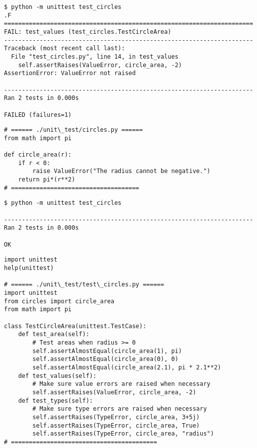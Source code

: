 \documentclass{beamer}
\begin{document}
\begin{frame}[fragile]{}
\begin{verbatim}
$ python -m unittest test_circles   
.F
======================================================================
FAIL: test_values (test_circles.TestCircleArea)
----------------------------------------------------------------------
Traceback (most recent call last):
  File "test_circles.py", line 14, in test_values
    self.assertRaises(ValueError, circle_area, -2)
AssertionError: ValueError not raised

----------------------------------------------------------------------
Ran 2 tests in 0.000s

FAILED (failures=1)
\end{verbatim}
\end{frame}

\begin{frame}[fragile]{}
\begin{verbatim}
# ====== ./unit\_test/circles.py ======
from math import pi

def circle_area(r):
    if r < 0:
        raise ValueError("The radius cannot be negative.")
    return pi*(r**2)
# ====================================
\end{verbatim}
\begin{verbatim}
$ python -m unittest test_circles

----------------------------------------------------------------------
Ran 2 tests in 0.000s

OK
\end{verbatim}
\end{frame}

\begin{frame}[fragile]{}
\begin{verbatim}
import unittest
help(unittest)

# ====== ./unit\_test/test\_circles.py ======
import unittest
from circles import circle_area
from math import pi

class TestCircleArea(unittest.TestCase):
    def test_area(self):
        # Test areas when radius >= 0
        self.assertAlmostEqual(circle_area(1), pi)
        self.assertAlmostEqual(circle_area(0), 0)
        self.assertAlmostEqual(circle_area(2.1), pi * 2.1**2)
    def test_values(self):
        # Make sure value errors are raised when necessary
        self.assertRaises(ValueError, circle_area, -2)
    def test_types(self):
        # Make sure type errors are raised when necessary
        self.assertRaises(TypeError, circle_area, 3+5j)
        self.assertRaises(TypeError, circle_area, True)
        self.assertRaises(TypeError, circle_area, "radius")
# =========================================
\end{verbatim}
\end{frame}
\end{document}
